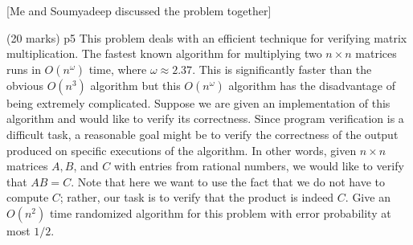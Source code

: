 \documentclass[a4paper, 11pt]{article}
\begin{document}
[Me and Soumyadeep discussed the problem together]\parinn
\newpage





\begin{problem}{%
		\hfill  (20 marks)
}{p5%
}
This problem deals with an efficient technique for verifying matrix multiplication. The fastest known algorithm for multiplying two $n \times n$ matrices runs in $O\left(n^\omega\right)$ time, where $\omega \approx 2.37$. This is significantly faster than the obvious $O\left(n^3\right)$ algorithm but this $O\left(n^\omega\right)$ algorithm has the disadvantage of being extremely complicated. Suppose we are given an implementation of this algorithm and would like to verify its correctness. Since program verification is a difficult task, a reasonable goal might be to verify the correctness of the output produced on specific executions of the algorithm. In other words, given $n \times n$ matrices $A, B$, and $C$ with entries from rational numbers, we would like to verify that $A B=C$. Note that here we want to use the fact that we do not have to compute $C$; rather, our task is to verify that the product is indeed $C$. Give an $O\left(n^2\right)$ time randomized algorithm for this problem with error probability at most $1 / 2$.
\end{problem}
\end{document}
